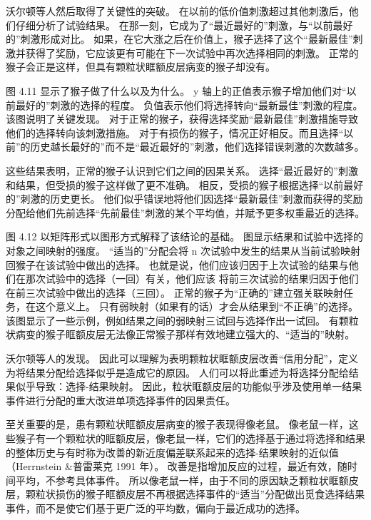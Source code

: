沃尔顿等人然后取得了关键性的突破。
在以前的低价值刺激超过其他刺激后，他们仔细分析了试验结果。
在那一刻，它成为了“最近最好的”刺激，与“以前最好的”刺激形成对比。
如果，在它大涨之后在价值上，猴子选择了这个“最新最佳”刺激并获得了奖励，它应该更有可能在下一次试验中再次选择相同的刺激。
正常的猴子会正是这样，但具有颗粒状眶额皮层病变的猴子却没有。\par


图 4.11 显示了猴子做了什么以及为什么。
y 轴上的正值表示猴子增加他们对“以前最好的”刺激的选择的程度。
负值表示他们将选择转向“最新最佳”刺激的程度。
该图说明了关键发现。
对于正常的猴子，获得选择奖励“最新最佳”刺激措施导致他们的选择转向该刺激措施。
对于有损伤的猴子，情况正好相反。而且选择“以前”的历史越长最好的”而不是“最近最好的”刺激，他们选择错误刺激的次数越多。\par


这些结果表明，正常的猴子认识到它们之间的因果关系。
选择“最近最好的”刺激和结果，但受损的猴子这样做了更不准确。
相反，受损的猴子根据选择“以前最好的”刺激的历史更长。
他们似乎错误地将他们因选择“最新最佳”刺激而获得的奖励分配给他们先前选择“先前最佳”刺激的某个平均值，并赋予更多权重最近的选择。\par


图 4.12 以矩阵形式以图形方式解释了该结论的基础。
图显示结果和试验中选择的对象之间映射的强度。
“适当的”分配会将 n 次试验中发生的结果从当前试验映射回猴子在该试验中做出的选择。
也就是说，他们应该归因于上次试验的结果与他们在那次试验中的选择（一回）有关，他们应该
将前三次试验的结果归因于他们在前三次试验中做出的选择（三回）。
正常的猴子为“正确的”建立强关联映射任务，在这个意义上。
只有弱映射（如果有的话）才会从结果到“不正确”的选择。
该图显示了一些示例，例如结果之间的弱映射三试回与选择作出一试回。
有颗粒状病变的猴子眶额皮层无法像正常猴子那样有效地建立强大的、“适当的”映射。\par


沃尔顿等人的发现。
因此可以理解为表明颗粒状眶额皮层改善“信用分配”，定义为将结果分配给选择似乎是造成它的原因。
人们可以将此重述为将选择分配给结果似乎导致：选择-结果映射。
因此，粒状眶额皮层的功能似乎涉及使用单一结果事件进行分配的重大改进单项选择事件的因果责任。\par


至关重要的是，患有颗粒状眶额皮层病变的猴子表现得像老鼠。
像老鼠一样，这些猴子有一个颗粒状的眶额皮层，像老鼠一样，它们的选择基于通过将选择和结果的整体历史与有时称为改善的新近度偏差联系起来的选择-结果映射的近似值（Herrnstein \&普雷莱克 1991 年）。
改善是指增加反应的过程，最近有效，随时间平均，不参考具体事件。
所以像老鼠一样，由于不同的原因缺乏颗粒状眶额皮层，颗粒状损伤的猴子眶额皮层不再根据选择事件的“适当”分配做出觅食选择结果事件，而不是使它们基于更广泛的平均数，偏向于最近成功的选择。\par


